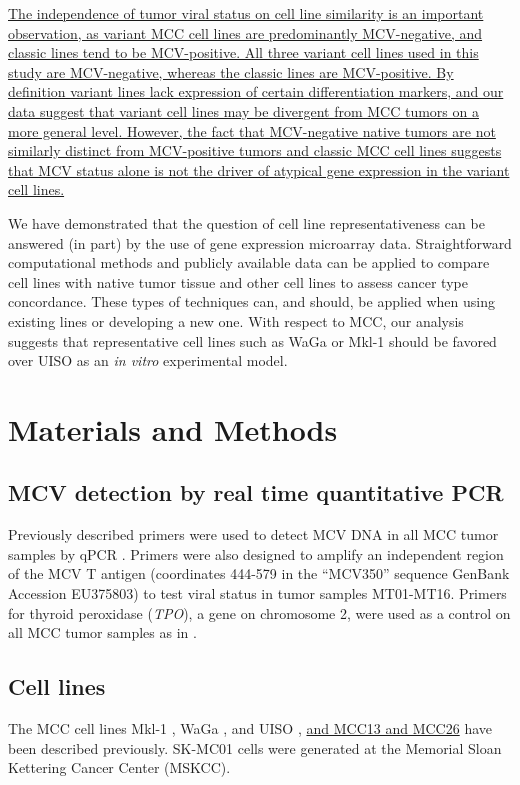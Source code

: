 \documentclass[10pt]{article}
\begin{document}
\uline{The independence of tumor viral status on cell line similarity is an important observation, as variant MCC cell lines are predominantly MCV-negative, and classic lines tend to be MCV-positive. 
All three variant cell lines used in this study are MCV-negative, whereas the classic lines are MCV-positive.
By definition variant lines lack expression of certain differentiation markers, and our data suggest that variant cell lines may be divergent from MCC tumors on a more general level. 
However, the fact that MCV-negative native tumors are not similarly distinct from MCV-positive tumors and classic MCC cell lines suggests that MCV status alone is not the driver of atypical gene expression in the variant cell lines.}

We have demonstrated that the question of cell line representativeness can be answered (in part) by the use of gene expression microarray data.
Straightforward computational methods and publicly available data can be applied to compare cell lines with native tumor tissue and other cell lines to assess cancer type concordance.
These types of techniques can, and should, be applied when using existing lines or developing a new one.
With respect to MCC, our analysis suggests that representative cell lines such as WaGa or Mkl-1 should be favored over UISO as an \emph{in vitro} experimental model.

\section*{Materials and Methods}

\subsection*{MCV detection by real time quantitative PCR}
Previously described primers were used to detect MCV DNA in all MCC tumor samples by qPCR \cite[personal~communication]{Garneski2008Merkel}.
Primers were also designed to amplify an independent region of the MCV T antigen (coordinates 444-579 in the ``MCV350'' sequence GenBank Accession EU375803) to test viral status in tumor samples MT01-MT16.
Primers for thyroid peroxidase (\emph{TPO}), a gene on chromosome 2, were used as a control on all MCC tumor samples as in \citep{Paulson2008ArrayCGH}.

\subsection*{Cell lines}
The MCC cell lines Mkl-1 \citep{Rosen1987Establishment}, WaGa \citep{Houben2010Merkel}, and UISO \citep{Ronan1993Merkel}, \uline{and MCC13 and MCC26} \citep{Leonard1995Characterisation} have been described previously.
SK-MC01 cells were generated at the Memorial Sloan Kettering Cancer Center (MSKCC).
\end{document}
